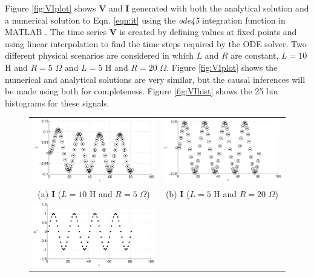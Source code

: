 Figure \ref{fig:VIplot} shows $\mathbf{V}$ and $\mathbf{I}$ generated with both the analytical solution and a numerical solution to Eqn. \ref{eqn:it} using the {\em ode45} integration function in {\sc MATLAB }.  The time series $\mathbf{V}$ is created by defining values at fixed points and using linear interpolation to find the time steps required by the ODE solver.  Two different physical scenarios are considered in which $L$ and $R$ are constant, $L=10$ H and $R=5$ $\Omega$ and $L=5$ H and $R=20$ $\Omega$.  Figure \ref{fig:VIplot} shows the numerical and analytical solutions are very similar, but the causal inferences will be made using both for completeness.  Figure \ref{fig:VIhist} shows the 25 bin histograms for these signals. 
\begin{figure}[ht]
\begin{center}
\begin{tabular}{cc}
\includegraphics[scale=0.48]{IRCircuitResponseExampleL10R5_Y.eps} &
\includegraphics[scale=0.48]{IRCircuitResponseExampleL5R20_Y.eps} \\
(a) $\mathbf{I}$ ($L=10$ H and $R=5$ $\Omega$) & (b) $\mathbf{I}$ ($L=5$ H and $R=20$ $\Omega$)\\
\includegraphics[scale=0.48]{IRCircuitResponseExampleL10R5_X.eps} \\

\end{tabular}
\end{center}
\end{figure}
